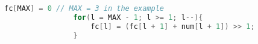 \documentclass{subfiles}
\begin{document}
    \begin{figure*}[!hb]
        \centering
        \begin{subfigure}{0.5725\textwidth}
            \centering
            \begin{lstlisting}[language=C]
                fc[MAX] = 0 // MAX = 3 in the example
                for(l = MAX - 1; l >= 1; l--){
                    fc[l] = (fc[l + 1] + num[l + 1]) >> 1;
                }
            \end{lstlisting}
        \end{subfigure}
    \end{figure*}
    \addtocounter{figure}{-1}
\end{document}
